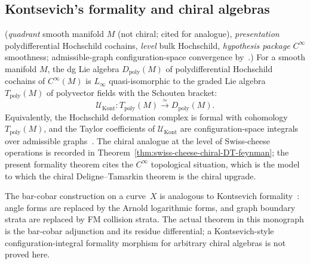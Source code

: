\subsection{Kontsevich's formality and chiral algebras}

\begin{theorem}
\label{thm:kontsevich-formality-feynman}
\textup{(}\emph{quadrant} smooth manifold $M$ \textup{(}not chiral; cited
for analogue\textup{)}, \emph{presentation} polydifferential Hochschild
cochains, \emph{level} bulk Hochschild,
\emph{hypothesis package} $C^\infty$ smoothness; admissible-graph
configuration-space convergence by~\cite{Kon03}.\textup{)}
For a smooth manifold $M$, the dg Lie algebra
$D_{\mathrm{poly}}(M)$ of polydifferential Hochschild cochains of
$C^\infty(M)$ is $L_\infty$ quasi-isomorphic to the graded Lie algebra
$T_{\mathrm{poly}}(M)$ of polyvector fields with the Schouten bracket:
\[
\mathcal U_{\mathrm{Kont}}\colon
T_{\mathrm{poly}}(M)\xrightarrow{\simeq}D_{\mathrm{poly}}(M).
\]
Equivalently, the Hochschild deformation complex is formal with
cohomology $T_{\mathrm{poly}}(M)$, and the Taylor coefficients of
$\mathcal U_{\mathrm{Kont}}$ are configuration-space integrals over
admissible graphs~\cite{Kon03}. The chiral analogue at the level of
Swiss-cheese operations is recorded in
Theorem~\ref{thm:swiss-cheese-chiral-DT-feynman}; the present formality
theorem cites the $C^\infty$ topological situation, which is the model
to which the chiral Deligne--Tamarkin theorem is the chiral upgrade.
\end{theorem}

\begin{remark}
\label{rem:kontsevich-graphs}
\label{sec:connections-other-feynman}
The bar-cobar construction on a curve~$X$ is analogous to
Kontsevich formality~\cite{Kon99}: angle forms are replaced by the
Arnold logarithmic forms, and graph boundary strata are replaced by FM
collision strata.  The actual theorem in this monograph is the
bar-cobar adjunction and its residue differential; a Kontsevich-style
configuration-integral formality morphism for arbitrary chiral
algebras is not proved here.
\end{remark}


